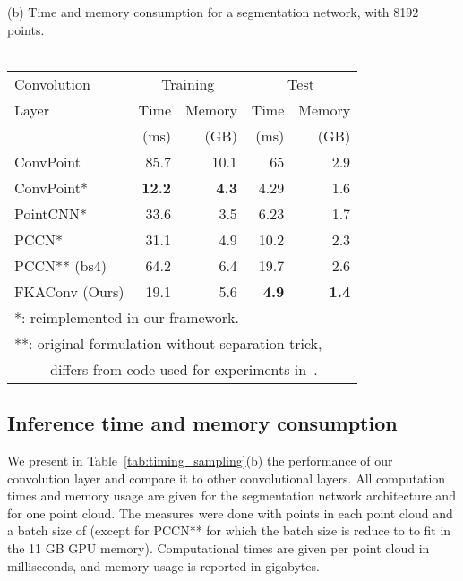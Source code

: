 \begin{table}[t]
\begin{minipage}{0.49\linewidth}
(b) Time and memory consumption for a segmentation network, with 8192 points.~\\~\\
{
\tiny
\begin{tabular}{l|rr|rr}Convolution & \multicolumn{2}{c|}{Training} & \multicolumn{2}{c}{Test}\\
Layer       & Time  & Memory& Time  & Memory\\
            & (ms)  & (GB)  & (ms)  & (GB)  \\
\hline
ConvPoint~\cite{boulch2020convpoint} & 85.7 & 10.1   & 65    & 2.9   \\
ConvPoint*                              & \textbf{12.2} & \textbf{4.3}    & 4.29  & 1.6  \\
PointCNN*~\cite{li2018pointcnn}         & 33.6 & 3.5    & 6.23  & 1.7  \\
PCCN*~\cite{wang2018deep}               & 31.1 & 4.9    & 10.2  & 2.3  \\
PCCN** (bs4)                            & 64.2 & 6.4    & 19.7  & 2.6  \\
\hline
FKAConv (Ours)                              & 19.1 & 5.6   & \textbf{4.9}  & \textbf{1.4}  \\
\multicolumn{5}{l}{*: reimplemented in our framework.}\\
\multicolumn{5}{l}{**: original formulation without separation trick,}\\
\multicolumn{5}{l}{~~~~~differs from code used for experiments in~\cite{wang2018deep}.}
\end{tabular}
}
\end{minipage}
\end{table}


\subsection{Inference time and memory consumption}

We present in Table~\ref{tab:timing_sampling}(b) the performance of our convolution layer and compare it to other convolutional layers.
All computation times and memory usage are given for the segmentation network architecture and for one point cloud. The measures were done with  points in each point cloud and a batch size of  (except for PCCN** for which the batch size is reduce to  to fit in the 11 GB GPU memory).
Computational times are given per point cloud in milliseconds, and memory usage is reported in gigabytes.

